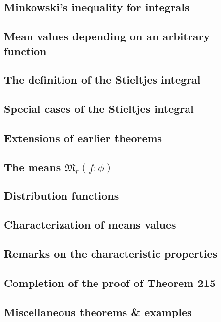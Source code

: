 \documentclass[oneside]{book}
\numberwithin{equation}{section}
\begin{document}
\subsection{Minkowski's inequality for integrals}

\subsection{Mean values depending on an arbitrary function}

\subsection{The definition of the Stieltjes integral}

\subsection{Special cases of the Stieltjes integral}

\subsection{Extensions of earlier theorems}

\subsection{The means $\mathfrak{M}_r(f;\phi)$}

\subsection{Distribution functions}

\subsection{Characterization of means values}

\subsection{Remarks on the characteristic properties}

\subsection{Completion of the proof of Theorem 215}

\subsection{Miscellaneous theorems \& examples}
\end{document}
